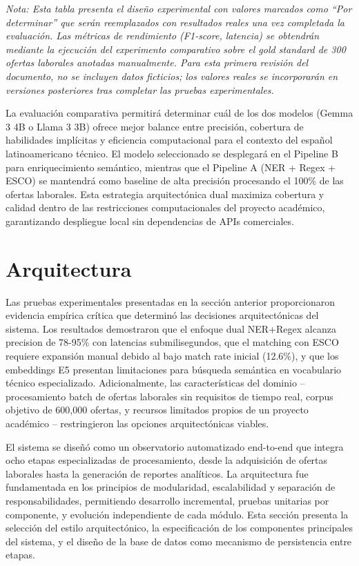\textit{Nota: Esta tabla presenta el diseño experimental con valores marcados como ``Por determinar'' que serán reemplazados con resultados reales una vez completada la evaluación. Las métricas de rendimiento (F1-score, latencia) se obtendrán mediante la ejecución del experimento comparativo sobre el gold standard de 300 ofertas laborales anotadas manualmente. Para esta primera revisión del documento, no se incluyen datos ficticios; los valores reales se incorporarán en versiones posteriores tras completar las pruebas experimentales.}

La evaluación comparativa permitirá determinar cuál de los dos modelos (Gemma 3 4B o Llama 3 3B) ofrece mejor balance entre precisión, cobertura de habilidades implícitas y eficiencia computacional para el contexto del español latinoamericano técnico. El modelo seleccionado se desplegará en el Pipeline B para enriquecimiento semántico, mientras que el Pipeline A (NER + Regex + ESCO) se mantendrá como baseline de alta precisión procesando el 100\% de las ofertas laborales. Esta estrategia arquitectónica dual maximiza cobertura y calidad dentro de las restricciones computacionales del proyecto académico, garantizando despliegue local sin dependencias de APIs comerciales.

\section{Arquitectura}

Las pruebas experimentales presentadas en la sección anterior proporcionaron evidencia empírica crítica que determinó las decisiones arquitectónicas del sistema. Los resultados demostraron que el enfoque dual NER+Regex alcanza precision de 78-95\% con latencias submilisegundos, que el matching con ESCO requiere expansión manual debido al bajo match rate inicial (12.6\%), y que los embeddings E5 presentan limitaciones para búsqueda semántica en vocabulario técnico especializado. Adicionalmente, las características del dominio -- procesamiento batch de ofertas laborales sin requisitos de tiempo real, corpus objetivo de 600,000 ofertas, y recursos limitados propios de un proyecto académico -- restringieron las opciones arquitectónicas viables.

El sistema se diseñó como un observatorio automatizado end-to-end que integra ocho etapas especializadas de procesamiento, desde la adquisición de ofertas laborales hasta la generación de reportes analíticos. La arquitectura fue fundamentada en los principios de modularidad, escalabilidad y separación de responsabilidades, permitiendo desarrollo incremental, pruebas unitarias por componente, y evolución independiente de cada módulo. Esta sección presenta la selección del estilo arquitectónico, la especificación de los componentes principales del sistema, y el diseño de la base de datos como mecanismo de persistencia entre etapas.

